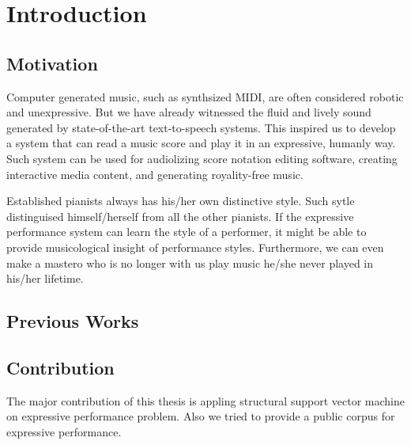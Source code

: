 \chapter{Introduction}
\section{Motivation}
Computer generated music, such as synthsized MIDI, are often considered robotic and unexpressive. But we have already witnessed the fluid and lively sound generated by state-of-the-art text-to-speech systems. This inspired us to develop a system that can read a music score and play it in an expressive, humanly way. Such system can be used for audiolizing score notation editing software, creating interactive media content, and generating royality-free music. 

Established pianists always has his/her own distinctive style. Such sytle distinguised himself/herself from all the other pianists. If the expressive performance system can learn the style of a performer, it might be able to provide musicological insight of performance styles. Furthermore, we can even make a mastero who is no longer with us play music he/she never played in his/her lifetime.


\section{Previous Works}



%
%




\section{Contribution}
The major contribution of this thesis is appling structural support vector machine on expressive performance problem. Also we tried to provide a public corpus for expressive performance. 
%
%
